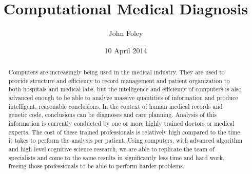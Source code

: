 \documentclass[11pt]{article}
\title{Computational Medical Diagnosis}
\author{John Foley}
\date{10 April 2014}
\begin{document}
\maketitle

\thispagestyle{empty}

\begin{abstract}
  Computers are increasingly being used in the medical industry. They are used to provide structure and efficiency to record 
  management and patient organization to both hospitals and medical labs, but the intelligence and efficiency of computers
  is also advanced enough to be able to analyze massive quantities of information and produce intelligent, reasonable
  conclusions. In the context of human medical records and genetic code, conclusions can be diagnoses and care planning. Analysis of this information is
  currently conducted by one or more highly trained doctors or medical experts. The cost of these trained professionals
  is relatively high compared to the time it takes to perform the analysis per patient. Using computers, with advanced
  algorithm and high level cognitive science research, we are able to replicate the team of specialists and come to the same
  results in significantly less time and hard work, freeing those professionals to be able to perform harder problems.
\end{abstract}

\pagebreak
\end{document}
